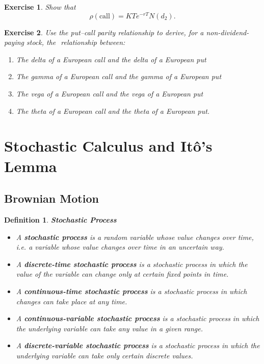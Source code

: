 \documentclass[letterpaper,10pt]{article}
\newtheorem{df}{Definition}[section]
\newtheorem{ex}{Exercise}
\begin{document}
\begin{ex}
Show that $$\rho(\text{call})=KTe^{-rT}N(d_2).$$
\end{ex}


\begin{ex}
Use the put–call parity relationship to derive, for a non-dividend-paying stock, the
­ relationship between:
\begin{enumerate}
\item The delta of a European call and the delta of a European put
\item The gamma of a European call and the gamma of a European put
\item  The vega of a European call and the vega of a European put
\item  The theta of a European call and the theta of a European put.
\end{enumerate}
\end{ex}




\newpage







\section{Stochastic Calculus and It\^{o}'s Lemma}

\subsection{Brownian Motion}

\begin{df}{\bf Stochastic Process}

\begin{itemize}

\item A {\bf stochastic process} is a random variable whose value changes over time, i.e. a variable whose value changes over time in an uncertain way.  

\item A {\bf discrete-time stochastic process} is a stochastic process in which the value of the variable can change only at certain fixed points in time.

\item  A {\bf continuous-time stochastic process} is a stochastic process in which changes can take place at any time.

\item A {\bf continuous-variable stochastic process} is a stochastic process in which the underlying variable can take any value in a given range.

\item A {\bf discrete-variable stochastic process} is a stochastic process in which the underlying variable can take only certain discrete values.


\end{itemize}

\end{df}
\end{document}
